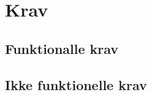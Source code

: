 \thispagestyle{fancy}
\chapter{Krav}
\label{chp:krav}

\section{Funktionalle krav}
\label{sec:funktionellekrav}


\section{Ikke funktionelle krav}
\label{sec:ikkefunktionellekrav}